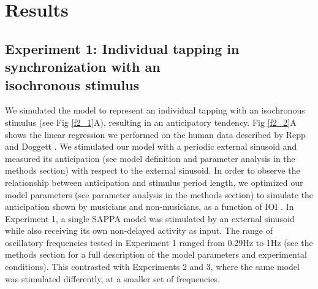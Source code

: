 \documentclass{report}
\begin{document}
\section{Results}

\subsection{Experiment 1: Individual tapping in synchronization with an \\ isochronous stimulus}

We simulated the model to represent an individual tapping with an isochronous stimulus (see Fig \ref{f2_1}A), resulting in an anticipatory tendency. Fig \ref{f2_2}A shows the linear regression we performed on the human data described by Repp and Doggett \cite{repp2007tapping}. We stimulated our model with a periodic external sinusoid and measured its anticipation (see model definition and parameter analysis in the methods section) with respect to the external sinusoid. In order to observe the relationship between anticipation and stimulus period length, we optimized our model parameters (see parameter analysis in the methods section) to simulate the anticipation shown by musicians and non-musicians, as a function of IOI \cite{repp2007tapping}. In Experiment 1, a single SAPPA model was stimulated by an external sinusoid while also receiving its own non-delayed activity as input. The range of oscillatory frequencies tested in Experiment 1 ranged from 0.29Hz to 1Hz (see the methods section for a full description of the model parameters and experimental conditions). This contrasted with Experiments 2 and 3, where the same model was stimulated differently, at a smaller set of frequencies.
\end{document}
